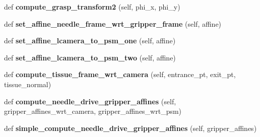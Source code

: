 \begin{DoxyCompactItemize}
\item 
def {\bfseries compute\+\_\+grasp\+\_\+transform2} (self, phi\+\_\+x, phi\+\_\+y)\hypertarget{classneedle__planner__gripper__working_1_1needle__planner_a46048d8e8581e2930634f01ca12a93a2}{}\label{classneedle__planner__gripper__working_1_1needle__planner_a46048d8e8581e2930634f01ca12a93a2}

\item 
def {\bfseries set\+\_\+affine\+\_\+needle\+\_\+frame\+\_\+wrt\+\_\+gripper\+\_\+frame} (self, affine)\hypertarget{classneedle__planner__gripper__working_1_1needle__planner_acb2fec067b27b52a076f2bc5b11d0e2f}{}\label{classneedle__planner__gripper__working_1_1needle__planner_acb2fec067b27b52a076f2bc5b11d0e2f}

\item 
def {\bfseries set\+\_\+affine\+\_\+lcamera\+\_\+to\+\_\+psm\+\_\+one} (self, affine)\hypertarget{classneedle__planner__gripper__working_1_1needle__planner_ac5705e06f3515e6ab9eaa05aca0796d8}{}\label{classneedle__planner__gripper__working_1_1needle__planner_ac5705e06f3515e6ab9eaa05aca0796d8}

\item 
def {\bfseries set\+\_\+affine\+\_\+lcamera\+\_\+to\+\_\+psm\+\_\+two} (self, affine)\hypertarget{classneedle__planner__gripper__working_1_1needle__planner_a27ae36a9b50f086990b13ee95c9787d8}{}\label{classneedle__planner__gripper__working_1_1needle__planner_a27ae36a9b50f086990b13ee95c9787d8}

\item 
def {\bfseries compute\+\_\+tissue\+\_\+frame\+\_\+wrt\+\_\+camera} (self, entrance\+\_\+pt, exit\+\_\+pt, tissue\+\_\+normal)\hypertarget{classneedle__planner__gripper__working_1_1needle__planner_a8b7efeaa5fabe3fea53e0f5471fae1ec}{}\label{classneedle__planner__gripper__working_1_1needle__planner_a8b7efeaa5fabe3fea53e0f5471fae1ec}

\item 
def {\bfseries compute\+\_\+needle\+\_\+drive\+\_\+gripper\+\_\+affines} (self, gripper\+\_\+affines\+\_\+wrt\+\_\+camera, gripper\+\_\+affines\+\_\+wrt\+\_\+psm)\hypertarget{classneedle__planner__gripper__working_1_1needle__planner_a8167765251ca5eade9af9d8a2703554b}{}\label{classneedle__planner__gripper__working_1_1needle__planner_a8167765251ca5eade9af9d8a2703554b}

\item 
def {\bfseries simple\+\_\+compute\+\_\+needle\+\_\+drive\+\_\+gripper\+\_\+affines} (self, gripper\+\_\+affines)\hypertarget{classneedle__planner__gripper__working_1_1needle__planner_a67db5f48ebdade93bee1075629e8079e}{}\label{classneedle__planner__gripper__working_1_1needle__planner_a67db5f48ebdade93bee1075629e8079e}


\end{DoxyCompactItemize}
